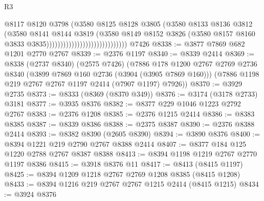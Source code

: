 \begin{lexlean}{R3}
\begin{coremodule}
                                                    @8117
                                                    @8120
                                                    @3798
                                                    (@3580
                                                      @8125
                                                      @8128
                                                      @3805
                                                      (@3580
                                                        @8133
                                                        @8136
                                                        @3812
                                                        (@3580
                                                          @8141
                                                          @8144
                                                          @3819
                                                          (@3580
                                                            @8149
                                                            @8152
                                                            @3826
                                                            (@3580
                                                              @8157
                                                              @8160
                                                              @3833
                                                              @3835)))))))))))))))))))))))))))))
    @7426
@8338 := @3877 @7869 @682 @1201 @2770 @2767
@8339 := @2376 @1197
@8340 := @8339 @2414
@8369 := @8338
    (@2737 @8340)
    (@2575 @7426)
    (@7886
      @178
      @1200
      @2767
      @2769
      @2736
      @8340
      (@3899 @7869 @160 @2736 (@3904 (@3905 @7869 @160)))
      (@7886 @1198 @219 @2767 @2767 @1197 @2414 (@7907 @1197) @7926))
@8370 := @3929 @2735
@8373 := @8333 (@8369 (@8370 @349))
@8376 := @3174 (@3178 @2733) @3181
@8377 := @3935 @8376
@8382 := @8377 @229 @1046 @1223 @2792 @2767
@8383 := @2376 @1208
@8385 := @2376 @1215 @2414
@8386 := @8383 @8385
@8387 := @8339 @8386
@8388 := @2375 @8387
@8390 := @2376 @8388 @2414
@8393 := @8382 @8390 (@2605 @8390)
@8394 := @3890 @8376
@8400 := @8394 @1221 @219 @2790 @2767 @8388 @2414
@8407 := @8377 @184 @125 @1220 @2788 @2767 @8387 @8388
@8413 := @8394 @1198 @1219 @2767 @2770 @1197 @8386
@8415 := @3918 @8376 @11
@8417 := @8413 (@8415 @1197)
@8425 := @8394 @1209 @1218 @2767 @2769 @1208 @8385 (@8415 @1208)
@8433 := @8394 @1216 @219 @2767 @2767 @1215 @2414 (@8415 @1215)
@8434 := @3924 @8376

\end{coremodule}
\end{lexlean}
